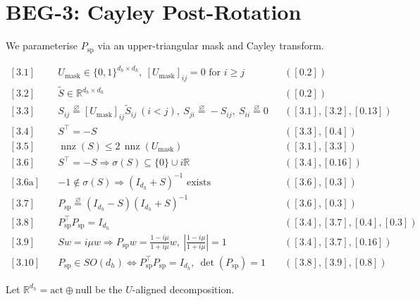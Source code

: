 \documentclass[11pt]{article}
\begin{document}
\section{BEG-3: Cayley Post-Rotation}

We parameterise $P_{\mathrm{sp}}$ via an upper-triangular mask and Cayley transform.

\begin{align}
\boxed{[3.1]}\quad & U_{\mathrm{mask}} \in \{0,1\}^{d_h\times d_h},\ [U_{\mathrm{mask}}]_{ij}=0 \text{ for } i\ge j &&([0.2])\\
\boxed{[3.2]}\quad & \tilde{S} \in \mathbb{R}^{d_h\times d_h} &&([0.2])\\
\boxed{[3.3]}\quad & S_{ij} \overset{\varnothing}{=} [U_{\mathrm{mask}}]_{ij} \tilde{S}_{ij} \ (i<j),\ S_{ji} \overset{\varnothing}{=} -S_{ij},\ S_{ii} \overset{\varnothing}{=} 0 &&([3.1],[3.2],[0.13])\\
\boxed{[3.4]}\quad & S^\top = -S &&([3.3],[0.4])\\
\boxed{[3.5]}\quad & \operatorname{nnz}(S) \le 2\, \operatorname{nnz}(U_{\mathrm{mask}}) &&([3.1],[3.3])\\
\boxed{[3.6]}\quad & S^\top = -S \Longrightarrow \sigma(S) \subseteq \{0\}\cup i\mathbb{R} &&([3.4],[0.16])\\
\boxed{[3.6\mathrm{a}]}\quad & -1 \notin \sigma(S) \Longrightarrow (I_{d_h}+S)^{-1} \text{ exists} &&([3.6],[0.3])\\
\boxed{[3.7]}\quad & P_{\mathrm{sp}} \overset{\varnothing}{=} (I_{d_h}-S)(I_{d_h}+S)^{-1} &&([3.6],[0.3])\\
\boxed{[3.8]}\quad & P_{\mathrm{sp}}^\top P_{\mathrm{sp}} = I_{d_h} &&([3.4],[3.7],[0.4],[0.3])\\
\boxed{[3.9]}\quad & S w = i\mu w \Rightarrow P_{\mathrm{sp}} w = \frac{1-i\mu}{1+i\mu} w,\ |\frac{1-i\mu}{1+i\mu}|=1 &&([3.4],[3.7],[0.16])\\
\boxed{[3.10]}\quad & P_{\mathrm{sp}} \in SO(d_h) \Longleftrightarrow P_{\mathrm{sp}}^\top P_{\mathrm{sp}}=I_{d_h},\ \det(P_{\mathrm{sp}})=1 &&([3.8],[3.9],[0.8])
\end{align}

Let $\mathbb{R}^{d_h} = \mathrm{act} \oplus \mathrm{null}$ be the $U$-aligned decomposition.
\end{document}
